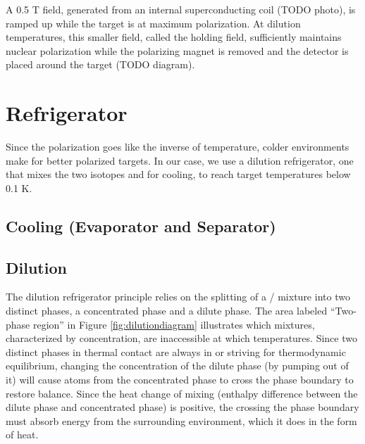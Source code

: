  
 A 0.5 T field, generated from an internal superconducting coil (TODO photo), is ramped up while the target is at maximum polarization.  At dilution temperatures, this smaller field, called the holding field, sufficiently maintains nuclear polarization while the polarizing magnet is removed and the detector is placed around the target (TODO diagram). 
 
 

\section{Refrigerator} 
Since the polarization goes like the inverse of temperature, colder environments make for better polarized targets.  In our case, we use a dilution refrigerator, one that mixes the two isotopes \het{} and \hef{} for cooling, to reach target temperatures below 0.1 K.

\subsection{\hef{}Cooling (Evaporator and Separator)}

\subsection{Dilution}

The dilution refrigerator principle relies on the splitting of a \het/\hef{} mixture into two distinct phases, a \het{} concentrated phase and a \het{} dilute phase.  The area labeled ``Two-phase region'' in Figure \ref{fig:dilutiondiagram} illustrates which mixtures, characterized by \het{} concentration, are inaccessible at which temperatures.  Since two distinct phases in thermal contact are always in or striving for thermodynamic equilibrium, changing the concentration of the dilute phase (by pumping \het{} out of it) will cause atoms from the concentrated phase to cross the phase boundary to restore balance.  Since the heat change of mixing (enthalpy difference between the dilute phase and concentrated phase) is positive, the \het{} crossing the phase boundary must absorb energy from the surrounding environment, which it does in the form of heat.\cite{hocktechniques}


